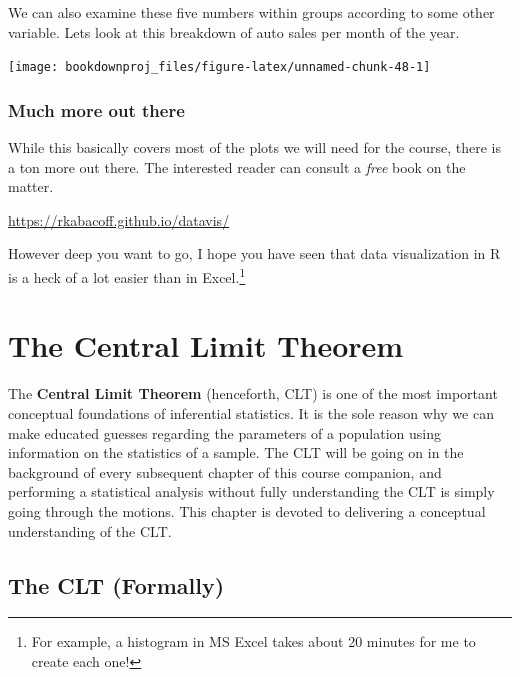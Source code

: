 \documentclass[
]{book}
\newenvironment{Shaded}{\begin{snugshade}}{\end{snugshade}}
\newcommand{\FunctionTok}[1]{\textcolor[rgb]{0.13,0.29,0.53}{\textbf{#1}}}
\newcommand{\NormalTok}[1]{#1}
\newcommand{\SpecialCharTok}[1]{\textcolor[rgb]{0.81,0.36,0.00}{\textbf{#1}}}
\begin{document}
We can also examine these five numbers within groups according to some other variable. Lets look at this breakdown of auto sales per month of the year.

\begin{Shaded}
\end{Shaded}

\begin{center}\texttt{[image: bookdownproj\_files/figure-latex/unnamed-chunk-48-1]} \end{center}

\subsection{Much more out there}\label{much-more-out-there}

While this basically covers most of the plots we will need for the course, there is a ton more out there. The interested reader can consult a \emph{free} book on the matter.

\url{https://rkabacoff.github.io/datavis/}

However deep you want to go, I hope you have seen that data visualization in R is a heck of a lot easier than in Excel.\footnote{For example, a histogram in MS Excel takes about 20 minutes for me to create each one!}

\chapter{The Central Limit Theorem}\label{CLT}

The \textbf{Central Limit Theorem} (henceforth, CLT) is one of the most important conceptual foundations of inferential statistics. It is the sole reason why we can make educated guesses regarding the parameters of a population using information on the statistics of a sample. The CLT will be going on in the background of every subsequent chapter of this course companion, and performing a statistical analysis without fully understanding the CLT is simply going through the motions. This chapter is devoted to delivering a conceptual understanding of the CLT.

\section{The CLT (Formally)}\label{the-clt-formally}
\end{document}
